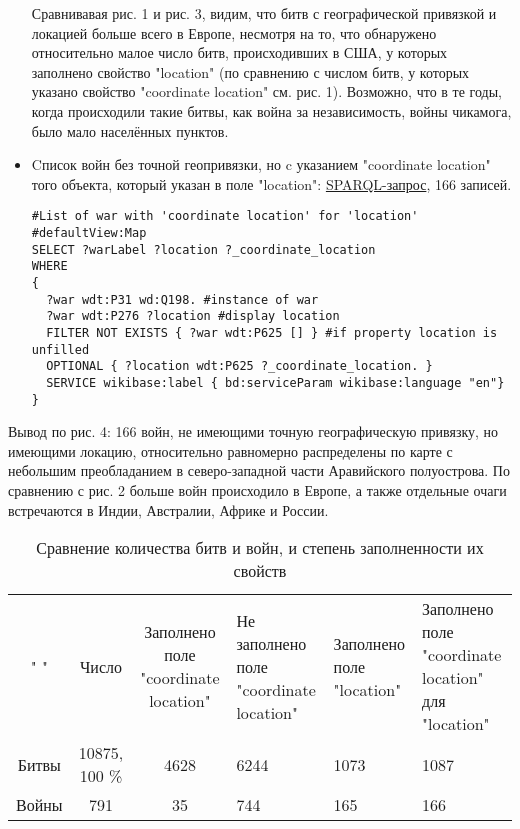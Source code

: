 \begin{itemize}
Сравнивавая рис. 1 и рис. 3, видим, что битв с географической привязкой и локацией больше всего в Европе, несмотря на то, что обнаружено относительно малое число битв, происходивших в США, у которых заполнено свойство "location" (по сравнению с числом битв, у которых указано свойство "coordinate location" см. рис. 1). Возможно, что в те годы, когда происходили такие битвы, как война за независимость, войны чикамога, было мало населённых пунктов.

\item{Cписок войн без точной геопривязки, но c указанием "coordinate location" того объекта, который указан в поле "location":} \href{https://query.wikidata.org/#%23List%20of%20war%20with%20unfilled%20property%20%27location%27%20%0A%23defaultView%3AMap%0ASELECT%20%3FwarLabel%20%3Flocation%20%3F_coordinate_location%0AWHERE%0A%7B%0A%20%20%3Fwar%20wdt%3AP31%20wd%3AQ198.%20%23instance%20of%20war%0A%20%20%3Fwar%20wdt%3AP276%20%3Flocation%20%23display%20location%0A%20%20FILTER%20NOT%20EXISTS%20%7B%20%3Fwar%20wdt%3AP625%20%5B%5D%20%7D%20%23if%20property%20location%20is%20unfilled%0A%20%20OPTIONAL%20%7B%20%3Flocation%20wdt%3AP625%20%3F_coordinate_location.%20%7D%0A%20%20SERVICE%20wikibase%3Alabel%20%7B%20bd%3AserviceParam%20wikibase%3Alanguage%20%22en%22%7D%0A%7D}{ SPARQL-запрос}, 166 записей.
\begin{lstlisting}[language=SPARQL]
#List of war with 'coordinate location' for 'location'
#defaultView:Map
SELECT ?warLabel ?location ?_coordinate_location
WHERE
{
  ?war wdt:P31 wd:Q198. #instance of war
  ?war wdt:P276 ?location #display location
  FILTER NOT EXISTS { ?war wdt:P625 [] } #if property location is unfilled
  OPTIONAL { ?location wdt:P625 ?_coordinate_location. }
  SERVICE wikibase:label { bd:serviceParam wikibase:language "en"}
}
\end{lstlisting}
\end{itemize}

Вывод по рис. 4: 166 войн, не имеющими точную географическую привязку, но имеющими локацию, относительно равномерно распределены по карте с небольшим преобладанием в северо-западной части Аравийского полуострова. По сравнению с рис. 2 больше войн происходило в Европе, а также отдельные очаги встречаются в Индии, Австралии, Африке и России.

\begin{table}[H]
\caption{Сравнение количества битв и войн, и степень заполненности их свойств}
\label{tabular:timesandtenses}
\begin{center}
\begin{tabular}{ccc}

" " & Число & Заполнено поле "coordinate location" &  Не заполнено поле "coordinate location" & Заполнено поле "location" & Заполнено поле "coordinate location" для "location"\\ 
Битвы & 10875, 100 \% & 4628 & 6244 & 1073 & 1087 \\ 
Войны & 791 & 35 & 744 & 165 & 166 \\ 
\end{tabular}
\end{center}
\end{table}


